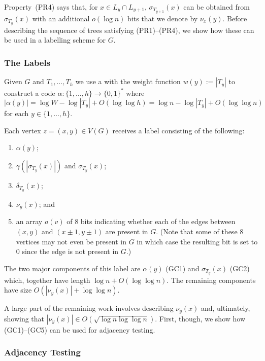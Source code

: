 \documentclass[kpfonts]{patmorin}
\begin{document}
Property~(PR4) says that, for $x\in L_y\cap L_{y+1}$, $\sigma_{T_{y+1}}(x)$ can be obtained from $\sigma_{T_{y}}(x)$ with an additional $o(\log n)$ bits that we denote by $\nu_x(y)$.  Before describing the sequence of trees satisfying (PR1)--(PR4), we show how these can be used in a labelling scheme for $G$. 

\subsubsection{The Labels}

Given $G$ and $T_{1},\ldots,T_h$ we use a  with the weight function $w(y):=|T_y|$ to construct a code $\alpha:\{1,\ldots,h\}\to\{0,1\}^*$ where
\[  
  |\alpha(y)| = \log W-\log|T_y| + O(\log\log h) = \log n - \log|T_y| + O(\log\log n)
\]
for each $y\in\{1,\ldots,h\}$.  

Each vertex $z=(x,y)\in V(G)$ receives a label consisting of the following:  
\begin{enumerate}[(GC1)]
  \item $\alpha(y)$;
  \item $\gamma(|\sigma_{T_y}(x)|)$ and $\sigma_{T_y}(x)$;    
  \item $\delta_{T_y}(x)$;
  \item $\nu_y(x)$; and
  \item an array $a(v)$ of $8$ bits indicating whether each of the edges between $(x,y)$ and $(x\pm 1,y\pm 1)$ are present in $G$.  (Note that some of these 8 vertices may not even be present in $G$ in which case the resulting bit is set to 0 since the edge is not present in $G$.)
\end{enumerate}
The two major components of this label are $\alpha(y)$ (GC1) and $\sigma_{T_y}(x)$ (GC2) which, together have length $\log n + O(\log\log n)$.  The remaining components have size $O(|\nu_y(x)|+\log\log n)$.  

A large part of the remaining work involves describing $\nu_y(x)$ and, ultimately, showing that $|\nu_y(x)|\in O(\sqrt{\log n\log\log n})$. First, though, we show how (GC1)--(GC5) can be used for adjacency testing.

\subsubsection{Adjacency Testing}
\end{document}
